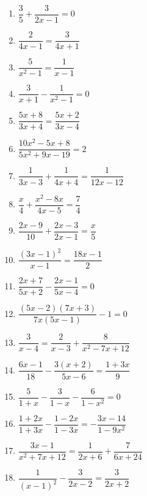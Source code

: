 \documentclass{article}
\begin{document}
\begin{enumerate}[label=\bfseries\small 142.\arabic*, itemsep=4cm]
\large

\item $\dfrac{3}{5} + \dfrac{3}{2x - 1} = 0$

\item $\dfrac{2}{4x - 1} = \dfrac{3}{4x + 1}$

\item $\dfrac{5}{x^2 - 1} = \dfrac{1}{x - 1}$

\item $\dfrac{3}{x + 1} - \dfrac{1}{x^2 - 1} = 0$

\item $\dfrac{5x + 8}{3x + 4} = \dfrac{5x + 2}{3x - 4}$

\item $\dfrac{10x^2 - 5x + 8}{5x^2 + 9x - 19} = 2$

\item $\dfrac{1}{3x-3} + \dfrac{1}{4x+4} = \dfrac{1}{12x-12}$

\item $\dfrac{x}{4} + \dfrac{x^2 - 8x}{4x-5} = \dfrac{7}{4}$

\item $\dfrac{2x-9}{10} + \dfrac{2x-3}{2x-1} = \dfrac{x}{5}$

\item $\dfrac{(3x-1)^2}{x-1} = \dfrac{18x-1}{2}$

\item $\dfrac{2x+7}{5x+2} - \dfrac{2x-1}{5x-4} = 0$

\item $\dfrac{(5x-2)(7x+3)}{7x(5x-1)} - 1 = 0$

\item $\dfrac{3}{x-4} = \dfrac{2}{x-3} + \dfrac{8}{x^2 - 7x + 12}$

\item $\dfrac{6x-1}{18} - \dfrac{3(x+2)}{5x-6} = \dfrac{1+3x}{9}$

\item $\dfrac{5}{1+x} - \dfrac{3}{1-x} - \dfrac{6}{1-x^2} = 0$

\item $\dfrac{1+2x}{1+3x} - \dfrac{1-2x}{1-3x} = -\dfrac{3x-14}{1-9x^2}$

\item $\dfrac{3x-1}{x^2+7x+12} = \dfrac{1}{2x+6} + \dfrac{7}{6x+24}$

\item $\dfrac{1}{(x-1)^2} - \dfrac{3}{2x-2} = \dfrac{3}{2x+2}$


\end{enumerate}
\end{document}
